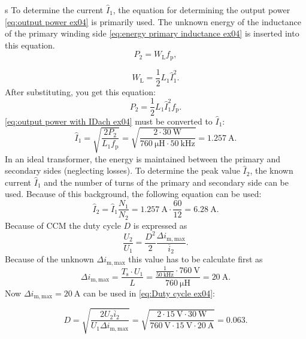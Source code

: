 \begin{solutionblock}s
To determine the current  $\hat I_\mathrm{1}$, the equation for determining the output power \eqref{eq:output power ex04} is primarily used. The unknown energy of the inductance of the primary winding side \eqref{eq:energy primary inductance ex04} is inserted into this equation.
\begin{equation}
    P_\mathrm{2} = W_\mathrm{L} f_\mathrm{p}, \label{eq:output power ex04}
\end{equation}

\begin{equation}
    W_\mathrm{L} = \frac{1}{2}L_\mathrm{1}\hat I_\mathrm{1}^2. \label{eq:energy primary inductance ex04}
\end{equation}
After substituting, you get this equation:
\begin{equation}
    P_\mathrm{2} = \frac{1}{2}L_\mathrm{1}\hat I_\mathrm{1}^2 f_\mathrm{p}.\label{eq:output power with IDach ex04}
\end{equation}
\eqref{eq:output power with IDach ex04} must be converted to $\hat I_\mathrm{1}$:
\begin{equation}
    \hat I_\mathrm{1} = \sqrt{\frac{2P_\mathrm{2}}{L_\mathrm{1}f_\mathrm{p}}}= \sqrt{\frac{2\cdot\SI{30}{\watt}}{\SI{760}{\micro\henry}\cdot\SI{50}{\kilo\hertz}}}=\SI{1.257}{\ampere}.
\end{equation}
In an ideal transformer, the energy is maintained between the primary and secondary sides (neglecting losses). To determine the peak value $\hat I_\mathrm{2}$, the known current $\hat I_\mathrm{1}$ and the number of turns of the primary and secondary side can be used. Because of this background, the following equation can be used:
\begin{equation}
    \hat I_\mathrm{2} = \hat I_\mathrm{1} \frac{N_\mathrm{1}}{N_\mathrm{2}} = \SI{1.257}{\ampere} \cdot \frac{60}{12} = \SI{6.28}{\ampere}.
\end{equation}
Because of CCM the duty cycle $D$ is expressed as
\begin{equation}
    \frac{U_2}{U_1} = \frac{D^2}{2} \frac{\Delta i_\mathrm{m,max}}{\overline{i}_2}. \label{eq:Duty cycle ex04}
\end{equation}
Because of the unknown $\Delta i_\mathrm{m,max}$ this value has to be calculate first as
\begin{equation}
    \Delta i_\mathrm{m,max}= \frac{T_\mathrm{s} \cdot U_1}{L} = \frac{\frac{1}{\SI{50}{\kilo\hertz}}\cdot \SI{760}{\volt}}{\SI{760}{\micro\henry}}=\SI{20}{\ampere}.
\end{equation}
Now $\Delta i_\mathrm{m,max}=\SI{20}{\ampere}$ can be used in \eqref{eq:Duty cycle ex04}:

\begin{equation}
    D = \sqrt{\frac{2U_2\overline{i}_2}{U_1\Delta i_\mathrm{m,max}}} = \sqrt{\frac{2\cdot \SI{15}{\volt}\cdot\SI{30}{\watt}}{\SI{760}{\volt}\cdot\SI{15}{\volt}\cdot\SI{20}{\ampere}}} = 0.063.
\end{equation}

\end{solutionblock}

